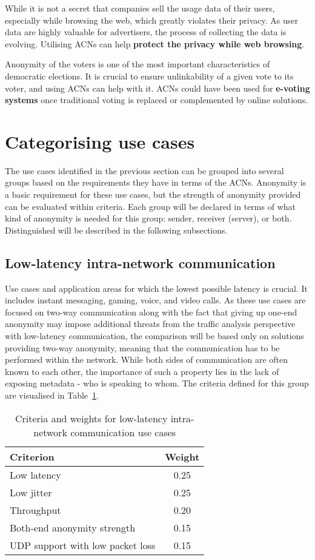 While it is not a secret that companies sell the usage data of their users, especially while browsing the web, which greatly violates their privacy. As user data are highly valuable for advertisers, the process of collecting the data is evolving. Utilising ACNs can help \textbf{protect the privacy while web browsing}.

Anonymity of the voters is one of the most important characteristics of democratic elections. It is crucial to ensure unlinkability of a given vote to its voter, and using ACNs can help with it. ACNs could have been used for \textbf{ e-voting systems} once traditional voting is replaced or complemented by online solutions.


\section{Categorising use cases}
The use cases identified in the previous section can be grouped into several groups based on the requirements they have in terms of the ACNs. Anonymity is a basic requirement for these use cases, but the strength of anonymity provided can be evaluated within criteria. Each group will be declared in terms of what kind of anonymity is needed for this group: sender, receiver (server), or both. Distinguished will be described in the following subsections.

\subsection{Low-latency intra-network communication}
Use cases and application areas for which the lowest possible latency is crucial. It includes instant messaging, gaming, voice, and video calls.
As these use cases are focused on two-way communication along with the fact that giving up one-end anonymity may impose additional threats from the traffic analysis perspective with low-latency communication, the comparison will be based only on solutions providing two-way anonymity, meaning that the communication has to be performed within the network. While both sides of communication are often known to each other, the importance of such a property lies in the lack of exposing metadata - who is speaking to whom.
The criteria defined for this group are visualised in Table~\ref{tab:low_latency_criteria}.

\begin{table}[!ht]
\centering
\caption{Criteria and weights for low-latency intra-network communication use cases}
\begin{tabular}{|l|c|}
\hline
\textbf{Criterion} & \textbf{Weight} \\
\hline
Low latency & 0.25 \\
Low jitter & 0.25 \\
Throughput & 0.20 \\
Both-end anonymity strength & 0.15 \\
UDP support with low packet loss & 0.15 \\
\hline
\end{tabular}
\label{tab:low_latency_criteria}
\end{table}

